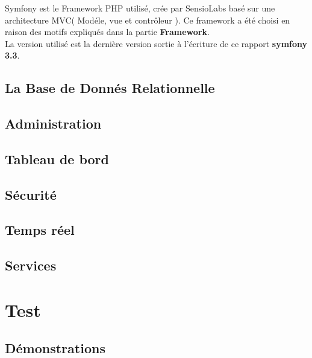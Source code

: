 \documentclass[12pt]{article}
\begin{document}
Symfony est le Framework PHP utilisé, crée par SensioLabs basé sur une
architecture MVC( Modéle, vue et contrôleur ). Ce framework a été choisi
en raison des motifs expliqués dans la partie \textbf{Framework}.\\
La version utilisé est la dernière version sortie à l’écriture de ce rapport \textbf{symfony 3.3}.
\\

\subsection{La Base de Donnés Relationnelle }

\subsection{Administration}

\subsection{Tableau de bord}

\subsection{Sécurité}

\subsection{Temps réel}

\subsection{Services}



\newpage

\section{Test}

\subsection{Démonstrations}
\end{document}
